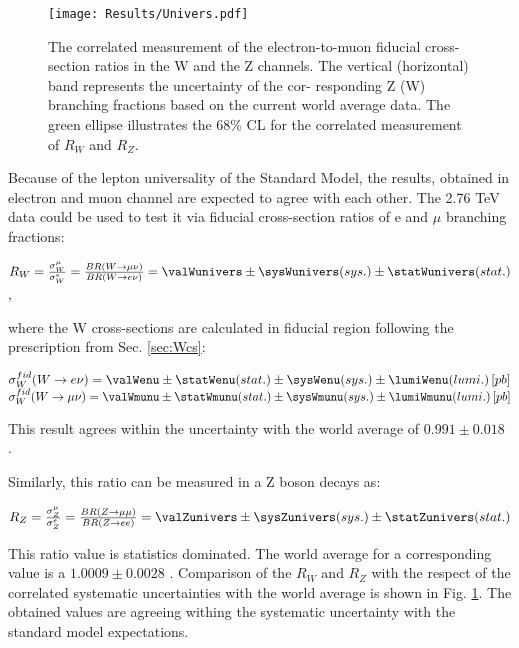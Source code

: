 \begin{figure}[!tb]
\begin{center}
\begin{minipage}[h]{0.8\linewidth}
\texttt{[image: Results/Univers.pdf]}
\end{minipage}
\caption{The correlated measurement of the electron-to-muon fiducial cross-section ratios in the W and the Z channels. The vertical (horizontal) band represents the uncertainty of the cor- responding Z (W) branching fractions based on the current world average data. The green ellipse illustrates the 68\% CL for the correlated measurement of $R_W$ and $R_Z$.}
\label{fig:LeptUnivers}
\end{center}
\end{figure}


Because of the lepton universality of the Standard Model, the results, obtained in electron and muon channel are expected to agree with each other. The 2.76 TeV data could be used to test it via fiducial cross-section ratios of e and $\mu$ branching fractions:
\begin{center}
$R_{W}=\frac{\sigma^{\mu}_W}{\sigma^{e}_W} = \frac{BR(\wmunu)}{BR(\wenu)}= \valWunivers \pm \sysWunivers (sys.) \pm \statWunivers (stat.)$,
\end{center}
where the W cross-sections are calculated in fiducial region following the prescription from Sec. \ref{sec:Wcs}:
\begin{center}
$\sigma^{fid}_{W}(\wenu) = \valWenu  \pm \statWenu (stat.) \pm \sysWenu (sys.) \pm \lumiWenu (lumi.) \, [pb]$\\
$\sigma^{fid}_{W}(\wmunu) = \valWmunu  \pm \statWmunu (stat.) \pm \sysWmunu (sys.) \pm \lumiWmunu (lumi.) \, [pb]$
\end{center}
This result agrees within the uncertainty with the world average of $0.991\pm0.018$ \cite{Agashe:2014kda}. 

Similarly, this ratio can be measured in a Z boson decays as:
\begin{center}
$R_{Z}=\frac{\sigma^{\mu}_Z}{\sigma^{e}_Z} = \frac{BR(Z\to \mu\mu)}{BR(Z \to ee)}= \valZunivers \pm \sysZunivers(sys.) \pm \statZunivers (stat.)$
\end{center}
This ratio value is statistics dominated. The world average for a corresponding value is a $1.0009 \pm 0.0028$ \cite{Agashe:2014kda}. Comparison of the $R_W$ and $R_Z$ with the respect of the correlated systematic uncertainties with the world average is shown in Fig. \ref{fig:LeptUnivers}. The obtained values are agreeing withing the systematic uncertainty with the standard model expectations.




